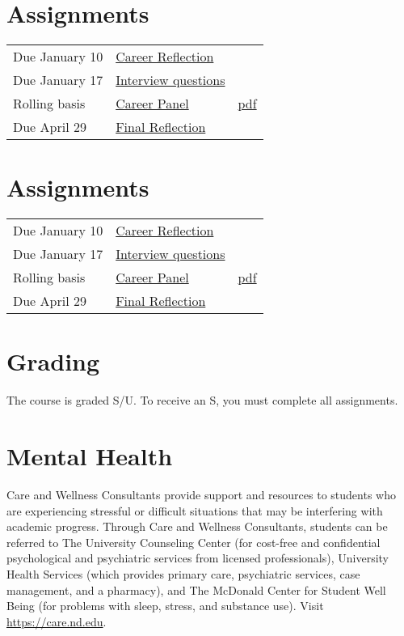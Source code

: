\documentclass[11pt]{article}
\begin{document}
\section{Assignments}
\label{sec:org27d37ef}
\begin{center}
\begin{tabular}{lll}
Due January 10 & \href{https://forms.gle/TsqC2PDdJU14JwN49}{Career Reflection} & \\
Due January 17 & \href{https://forms.gle/yRDjwjk5mkxFGZTt8}{Interview questions} & \\
Rolling basis & \href{./Assignments/Interview.org}{Career Panel} & \href{./Assignments/Interview.pdf}{pdf}\\
Due April 29 & \href{https://forms.gle/GjdNjfbhfEXnvLEF6}{Final Reflection} & \\
\end{tabular}
\end{center}

\section{Assignments}
\label{sec:org2114154}
\begin{center}
\begin{tabular}{lll}
Due January 10 & \href{https://forms.gle/TsqC2PDdJU14JwN49}{Career Reflection} & \\
Due January 17 & \href{https://forms.gle/yRDjwjk5mkxFGZTt8}{Interview questions} & \\
Rolling basis & \href{./Assignments/Interview.org}{Career Panel} & \href{./Assignments/Interview.pdf}{pdf}\\
Due April 29 & \href{https://forms.gle/GjdNjfbhfEXnvLEF6}{Final Reflection} & \\
\end{tabular}
\end{center}

\section{Grading}
\label{sec:org29b24d1}
The course is graded S/U. To receive an S, you must complete all assignments.

\section{Mental Health}
\label{sec:org43d67eb}
Care and Wellness Consultants provide support and resources to students who are experiencing stressful or difficult situations that may be interfering with academic progress. Through Care and Wellness Consultants, students can be referred to The University Counseling
Center (for cost-free and confidential psychological and psychiatric services from
licensed professionals), University Health Services (which provides primary care,
psychiatric services, case management, and a pharmacy), and The McDonald
Center for Student Well Being (for problems with sleep, stress, and substance
use). Visit \url{https://care.nd.edu}.
\end{document}
